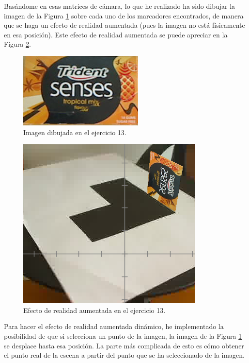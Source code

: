 \documentclass[a4paper,10pt,titlepage,oneside,openright]{book}
\begin{document}
Basándome en esas matrices de cámara, lo que he realizado ha sido dibujar la imagen de la Figura \ref{image} sobre cada uno de los marcadores encontrados, de manera que se haga un efecto de realidad aumentada (pues la imagen no está físicamente en esa posición). Este efecto de realidad aumentada se puede apreciar en la Figura \ref{effect}.
\begin{figure}[!th]
\includegraphics[scale=0.4]{thing} 
\centering
\caption{Imagen dibujada en el ejercicio 13.}
\label{image}
\end{figure}
\begin{figure}[!th]
\includegraphics[scale=0.4]{effect} 
\centering
\caption{Efecto de realidad aumentada en el ejercicio 13.}
\label{effect}
\end{figure}

Para hacer el efecto de realidad aumentada dinámico, he implementado la posibilidad de que si selecciona un punto de la imagen, la imagen de la Figura \ref{image} se desplace hasta esa posición. La parte más complicada de esto es cómo obtener el punto real de la escena a partir del punto que se ha seleccionado de la imagen. \\
\end{document}
